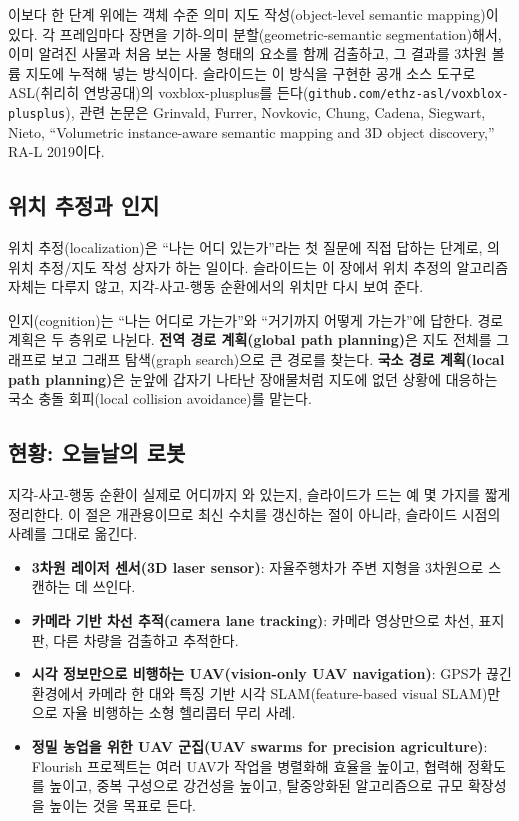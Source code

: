 이보다 한 단계 위에는 객체 수준 의미 지도 작성(object-level semantic
mapping)이 있다. 각 프레임마다 장면을 기하-의미 분할(geometric-semantic
segmentation)해서, 이미 알려진 사물과 처음 보는 사물 형태의 요소를 함께
검출하고, 그 결과를 3차원 볼륨 지도에 누적해 넣는 방식이다. 슬라이드는 이
방식을 구현한 공개 소스 도구로 ASL(취리히 연방공대)의 voxblox-plusplus를
든다(\texttt{github.com/ethz-asl/voxblox-plusplus}), 관련 논문은 Grinvald,
Furrer, Novkovic, Chung, Cadena, Siegwart, Nieto, ``Volumetric instance-aware
semantic mapping and 3D object discovery,'' RA-L 2019이다.

\subsection{위치 추정과 인지}
\label{sec:lec01-loc-cog}

위치 추정(localization)은 ``나는 어디 있는가''라는 첫 질문에 직접 답하는
단계로, 의 위치 추정/지도 작성 상자가 하는 일이다.
슬라이드는 이 장에서 위치 추정의 알고리즘 자체는 다루지 않고, 지각-사고-행동
순환에서의 위치만 다시 보여 준다. %

인지(cognition)는 ``나는 어디로 가는가''와 ``거기까지 어떻게 가는가''에
답한다. 경로 계획은 두 층위로 나뉜다. \textbf{전역 경로 계획(global path
planning)}은 지도 전체를 그래프로 보고 그래프 탐색(graph search)으로 큰
경로를 찾는다. \textbf{국소 경로 계획(local path planning)}은 눈앞에 갑자기
나타난 장애물처럼 지도에 없던 상황에 대응하는 국소 충돌 회피(local collision
avoidance)를 맡는다. %

\subsection{현황: 오늘날의 로봇}
\label{sec:lec01-status}

지각-사고-행동 순환이 실제로 어디까지 와 있는지, 슬라이드가 드는 예 몇 가지를
짧게 정리한다. 이 절은 개관용이므로 최신 수치를 갱신하는 절이 아니라, 슬라이드
시점의 사례를 그대로 옮긴다.

\begin{itemize}
  \item \textbf{3차원 레이저 센서(3D laser sensor)}: 자율주행차가 주변
    지형을 3차원으로 스캔하는 데 쓰인다. %
  \item \textbf{카메라 기반 차선 추적(camera lane tracking)}: 카메라 영상만으로
    차선, 표지판, 다른 차량을 검출하고 추적한다. %
  \item \textbf{시각 정보만으로 비행하는 UAV(vision-only UAV navigation)}: GPS가
    끊긴 환경에서 카메라 한 대와 특징 기반 시각 SLAM(feature-based visual
    SLAM)만으로 자율 비행하는 소형 헬리콥터 무리 사례. %
  \item \textbf{정밀 농업을 위한 UAV 군집(UAV swarms for precision
    agriculture)}: Flourish 프로젝트는 여러 UAV가 작업을 병렬화해 효율을
    높이고, 협력해 정확도를 높이고, 중복 구성으로 강건성을 높이고,
    탈중앙화된 알고리즘으로 규모 확장성을 높이는 것을 목표로 든다.
\end{itemize}

